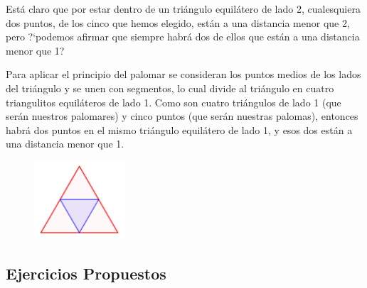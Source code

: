 		\begin{proofw}\renewcommand{\qedsymbol}{$\diamond$}
		
			Está claro que por estar dentro de un triángulo equilátero de lado 2, cualesquiera dos puntos, de los cinco que hemos elegido, están a una distancia menor que 2, pero ?`podemos afirmar que siempre habrá dos de ellos que están a una distancia menor que 1?

			Para aplicar el principio del palomar se consideran los puntos medios de los lados del triángulo y se unen con segmentos, lo cual divide al triángulo en cuatro triangulitos equiláteros de lado 1. Como son cuatro triángulos de lado 1 (que serán nuestros palomares) y cinco puntos (que serán nuestras palomas), entonces habrá dos puntos en el mismo triángulo equilátero de lado 1, y esos dos están a una distancia menor que 1.
			
			\begin{figure}[H]
			\centering
				\includegraphics[width=0.3\textwidth]{imagenes/imagenes01/T01IM07.png}
			\end{figure}
		\end{proofw}
		
		
	
	\subsection{Ejercicios Propuestos}
	
